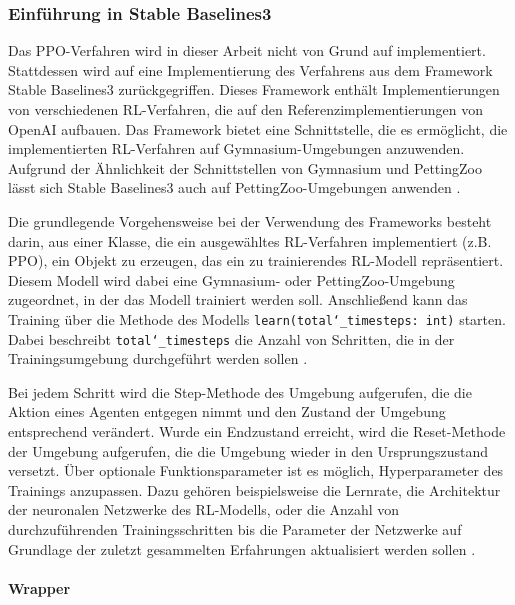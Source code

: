 \subsubsection{Einführung in Stable Baselines3}

Das PPO-Verfahren wird in dieser Arbeit nicht von Grund auf implementiert. Stattdessen wird auf eine Implementierung des Verfahrens aus dem Framework Stable Baselines3 zurückgegriffen. Dieses Framework enthält Implementierungen von verschiedenen RL-Verfahren, die auf den Referenzimplementierungen von OpenAI aufbauen. Das Framework bietet eine Schnittstelle, die es ermöglicht, die implementierten RL-Verfahren auf Gymnasium-Umgebungen anzuwenden. Aufgrund der Ähnlichkeit der Schnittstellen von Gymnasium und PettingZoo lässt sich Stable Baselines3 auch auf PettingZoo-Umgebungen anwenden \cite{Raffin.2021} \cite{Farama.2025}.

Die grundlegende Vorgehensweise bei der Verwendung des Frameworks besteht darin, aus einer Klasse, die ein ausgewähltes RL-Verfahren implementiert (z.B. PPO), ein Objekt zu erzeugen, das ein zu trainierendes RL-Modell repräsentiert. Diesem Modell wird dabei eine Gymnasium- oder PettingZoo-Umgebung zugeordnet, in der das Modell trainiert werden soll. Anschließend kann das Training über die Methode des Modells \texttt{learn(total\char`_timesteps: int)} starten. Dabei beschreibt \texttt{total\char`_timesteps} die Anzahl von Schritten, die in der Trainingsumgebung durchgeführt werden sollen \cite{Raffin.2021}.

Bei jedem Schritt wird die Step-Methode des Umgebung aufgerufen, die die Aktion eines Agenten entgegen nimmt und den Zustand der Umgebung entsprechend verändert. Wurde ein Endzustand erreicht, wird die Reset-Methode der Umgebung aufgerufen, die die Umgebung wieder in den Ursprungszustand versetzt. Über optionale Funktionsparameter ist es möglich, Hyperparameter des Trainings anzupassen. Dazu gehören beispielsweise die Lernrate, die Architektur der neuronalen Netzwerke des RL-Modells, oder die Anzahl von durchzuführenden Trainingsschritten bis die Parameter der Netzwerke auf Grundlage der zuletzt gesammelten Erfahrungen aktualisiert werden sollen \cite{Raffin.2021}.

\paragraph{Wrapper}

\label{wrapper}

